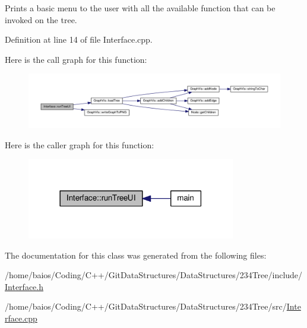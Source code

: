 Prints a basic menu to the user with all the available function that can be invoked on the tree. 



Definition at line 14 of file Interface.\-cpp.



Here is the call graph for this function\-:
\nopagebreak
\begin{figure}[H]
\begin{center}
\leavevmode
\includegraphics[width=350pt]{class_interface_a39dfccfcfc9027f148f1a0280ff34fe5_cgraph}
\end{center}
\end{figure}




Here is the caller graph for this function\-:\nopagebreak
\begin{figure}[H]
\begin{center}
\leavevmode
\includegraphics[width=258pt]{class_interface_a39dfccfcfc9027f148f1a0280ff34fe5_icgraph}
\end{center}
\end{figure}




The documentation for this class was generated from the following files\-:\begin{DoxyCompactItemize}
\item 
/home/baios/\-Coding/\-C++/\-Git\-Data\-Structures/\-Data\-Structures/234\-Tree/include/\hyperlink{_interface_8h}{Interface.\-h}\item 
/home/baios/\-Coding/\-C++/\-Git\-Data\-Structures/\-Data\-Structures/234\-Tree/src/\hyperlink{_interface_8cpp}{Interface.\-cpp}\end{DoxyCompactItemize}
